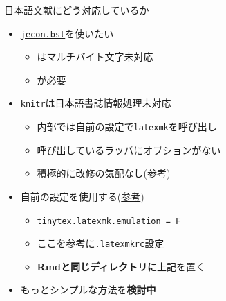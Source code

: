 \documentclass[
  14pt,
  ignorenonframetext,
]{beamer}
\providecommand{\tightlist}{%
  \setlength{\itemsep}{0pt}\setlength{\parskip}{0pt}}
\begin{document}
\begin{frame}[fragile]{日本語文献にどう対応しているか}
\protect\hypertarget{ux65e5ux672cux8a9eux6587ux732eux306bux3069ux3046ux5bfeux5fdcux3057ux3066ux3044ux308bux304b}{}

\begin{itemize}
\tightlist
\item
  \href{https://github.com/ShiroTakeda/jecon-bst/blob/master/jecon.bst}{\texttt{jecon.bst}}を使いたい

  \begin{itemize}
  \tightlist
  \item
    \BibTeX はマルチバイト文字未対応
  \item
    \upBibTeX が必要
  \end{itemize}
\item
  \texttt{knitr}は日本語書誌情報処理未対応

  \begin{itemize}
  \tightlist
  \item
    内部では自前の設定で\texttt{latexmk}を呼び出し
  \item
    呼び出しているラッパにオプションがない
  \item
    積極的に改修の気配なし(\href{https://github.com/yihui/tinytex/issues/70}{参考})
  \end{itemize}
\item
  自前の設定を使用する(\href{https://github.com/kenjimyzk/bookdown_ja_template}{参考})

  \begin{itemize}
  \tightlist
  \item
    \texttt{tinytex.latexmk.emulation\ =\ F}
  \item
    \href{https://texwiki.texjp.org/?Latexmk}{ここ}を参考に\texttt{.latexmkrc}設定
  \item
    \textbf{Rmdと同じディレクトリに}上記を置く
  \end{itemize}
\item
  もっとシンプルな方法を\textbf{検討中}
\end{itemize}

\end{frame}
\end{document}
